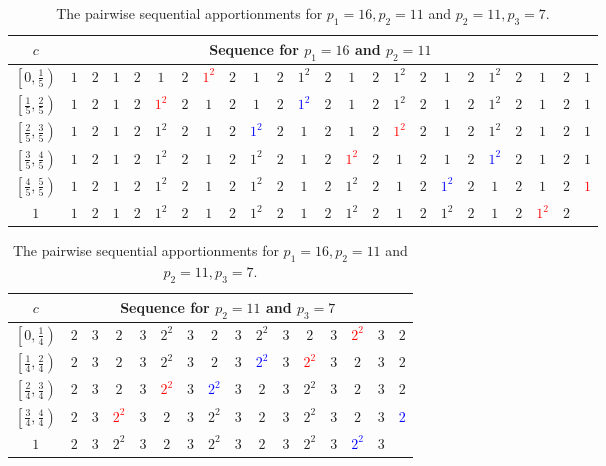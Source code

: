 \documentclass[pdflatex,sn-mathphys-num]{sn-jnl}
\theoremstyle{thmstyleone}%
\theoremstyle{thmstyletwo}%
\theoremstyle{thmstylethree}%
\begin{document}
\begin{table}
 \caption{The pairwise sequential apportionments for $p_1=16, p_2=11$ and $p_2=11,p_3=7$.}
\label{pairwise-seq-appt-example}
\renewcommand{\arraystretch}{1.2}
\setlength{\tabcolsep}{2pt}
\begin{tabular}{c|*{23}c}
$c$ &  \multicolumn{22}{c}{Sequence for $p_1 = 16$ and $p_2 = 11$} \\
\hline 
$\left[ 0, \frac{1}{5} \right)$ &  $1$ & $2$ & $1$ &  $2$ & $1$ & $2$  & \textcolor{red}{$1^2$} & $2$  & $1$ & $2$ &  $1^2$ & $2$ &  $1$ & $2$ & $1^2$ & $2$ & $1$ & $2$ & $1^2$ & $2$ & $1$  & $2$ &  $1$  \\
$\left[ \frac{1}{5}, \frac{2}{5} \right)$ & $1$ & $2$ & $1$ & $2$ & \textcolor{red}{$1^2$} & $2$ & $1$ & $2$ & $1$ & $2$ & \textcolor{blue}{$1^2$} & $2$ & $1$ & $2$ & $1^2$ & $2$ & $1$ & $2$ & $1^2$ & $2$ &$1$ &$2$ &$1$ \\
$\left[ \frac{2}{5}, \frac{3}{5} \right)$ & $1$ & $2$ & $1$ & $2$ & $1^2$ & $2$ & $1$ & $2$ & \textcolor{blue}{$1^2$} & $2$ & $1$ & $2$ & $1$ & $2$ & \textcolor{red}{$1^2$} & $2$ & $1$ & $2$ & $1^2$ & $2$ &$1$ &$2$ &$1$ \\
$\left[ \frac{3}{5}, \frac{4}{5} \right)$ & $1$ & $2$ & $1$ & $2$ & $1^2$ & $2$ & $1$ & $2$ & $1^2$ & $2$ & $1$ & $2$ & \textcolor{red}{$1^2$} & $2$ & $1$ & $2$ & $1$ & $2$ & \textcolor{blue}{$1^2$} & $2$ &$1$ &$2$ &$1$ \\
$\left[ \frac{4}{5}, \frac{5}{5} \right)$ & $1$ & $2$ & $1$ & $2$ & $1^2$ & $2$ & $1$ & $2$ & $1^2$ & $2$ & $1$ & $2$ & $1^2$ & $2$ & $1$ & $2$ & \textcolor{blue}{$1^2$} & $2$ & $1$ & $2$ &$1$ &$2$ &\textcolor{red}{$1$} \\
$1$ & $1$ & $2$ & $1$ & $2$ & $1^2$ & $2$ & $1$ & $2$ & $1^2$ & $2$ & $1$ & $2$ & $1^2$ & $2$ & $1$ & $2$ & $1^2$ & $2$ & $1$ & $2$ & \textcolor{red}{$1^2$} &$2$ &
 \end{tabular} 
%
%
\renewcommand{\arraystretch}{1.2}
\setlength{\tabcolsep}{2pt}
\begin{tabular}{c|*{15}c}
$c$ & \multicolumn{14}{c}{Sequence for $p_2 = 11$ and $p_3 = 7$}  \\
\hline 
$\left[ 0, \frac{1}{4} \right)$ & $2$ & $3$ & $2$ & $3$ & $2^2$ & $3$ & $2$ & $3$ & $2^2$ & $3$ & $2$ & $3$ & \textcolor{red}{$2^2$} & $3$ & $2$ \\
$\left[ \frac{1}{4}, \frac{2}{4} \right)$ & $2$ & $3$ & $2$ & $3$ & $2^2$ & $3$ & $2$ & $3$ & \textcolor{blue}{$2^2$} & $3$ & \textcolor{red}{$2^2$} & $3$ & $2$ & $3$ & $2$ \\
$\left[ \frac{2}{4}, \frac{3}{4} \right)$ & $2$ & $3$ & $2$ & $3$ & \textcolor{red}{$2^2$} & $3$ & \textcolor{blue}{$2^2$} & $3$ &$2$ & $3$ & $2^2$ & $3$ & $2$ & $3$ & $2$ \\
$\left[ \frac{3}{4}, \frac{4}{4} \right)$ & $2$ & $3$ & \textcolor{red}{$2^2$} & $3$ & $2$ & $3$ & $2^2$ & $3$ &$2$ & $3$ & $2^2$ & $3$ & $2$ & $3$ & \textcolor{blue}{$2$} \\
$1$ & $2$ & $3$ & $2^2$ & $3$ & $2$ & $3$ & $2^2$ & $3$ &$2$ & $3$ & $2^2$ & $3$ & \textcolor{blue}{$2^2$} & $3$ & 
 \end{tabular} 
\end{table}
\end{document}
